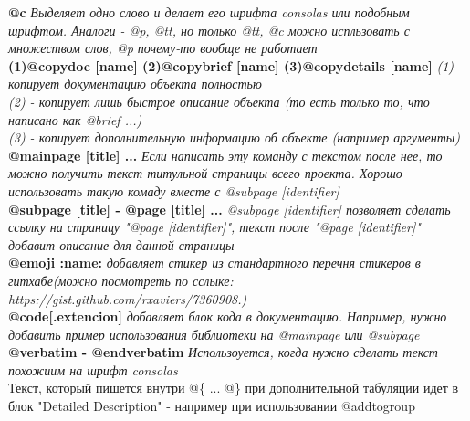 \textbf{@c}\newline
\textit{Выделяет одно слово и делает его шрифта consolas или подобным шрифтом. Аналоги - @p, @tt, но только @tt, @c можно испльзовать с множеством слов, @p почему-то вообще не работает}\\[3mm]

\textbf{(1)@copydoc [name] (2)@copybrief [name] (3)@copydetails [name]}\newline
\textit{(1) - копирует документацию объекта полностью\\(2) - копирует лишь быстрое описание объекта (то есть только то, что написано как @brief ...)\\ (3) - копирует дополнительную информацию об объекте (например аргументы)}\\[3mm]

\textbf{@mainpage [title] ...}\newline
\textit{Если написать эту команду с текстом после нее, то можно получить текст титульной страницы всего проекта. Хорошо использовать такую комаду вместе с @subpage [identifier]}\\[3mm]

\textbf{@subpage [title] - @page [title] ...}\newline
\textit{@subpage [identifier] позволяет сделать ссылку на страницу "@page [identifier]", текст после "@page [identifier]" добавит описание для данной страницы}\\[3mm]

\textbf{@emoji :name:}\newline
\textit{добавляет стикер из стандартного перечня стикеров в гитхабе(можно посмотреть по сслыке: https://gist.github.com/rxaviers/7360908.)}\\[3mm]

\textbf{@code[.extencion]}\newline
\textit{добавляет блок кода в документацию. Например, нужно добавить пример использования библиотеки на @mainpage или @subpage}\\[3mm]

\textbf{@verbatim - @endverbatim}\newline
\textit{Использоуется, когда нужно сделать текст похожиим на шрифт consolas}\\[3mm]

Текст, который пишется внутри @\{ ... @\} при дополнительной табуляции идет в блок \textrm{"}Detailed Description\textrm{"} - например при использовании @addtogroup 